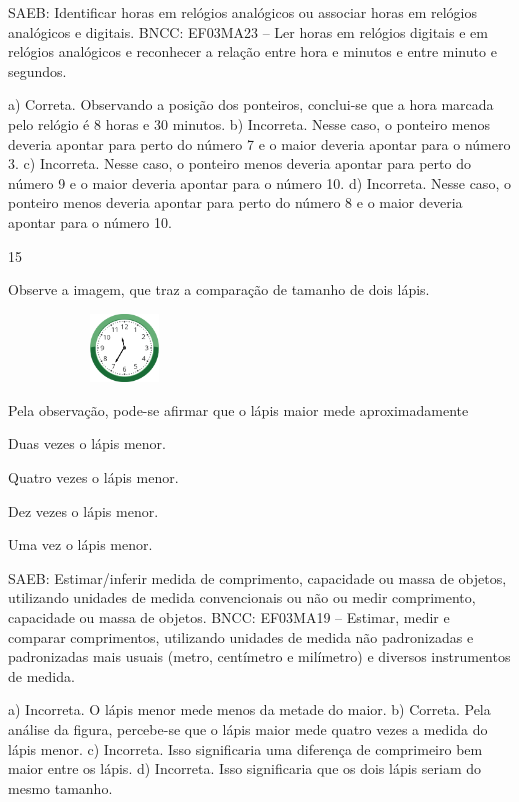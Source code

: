 \begin{multicols}{2}
\begin{enumerate}
{SAEB: Identificar horas em relógios analógicos ou associar
horas em relógios analógicos e digitais.
BNCC: EF03MA23 – Ler horas em relógios digitais e em relógios analógicos e reconhecer a relação
entre hora e minutos e entre minuto e segundos.


a) Correta. Observando a posição dos ponteiros, conclui-se que a hora marcada pelo
relógio é 8 horas e 30 minutos.
b) Incorreta. Nesse caso, o ponteiro menos deveria apontar para perto do número 7 e o maior deveria apontar para o número 3.
c) Incorreta. Nesse caso, o ponteiro menos deveria apontar para perto do número 9 e o maior deveria apontar para o número 10.
d) Incorreta. Nesse caso, o ponteiro menos deveria apontar para perto do número 8 e o maior deveria apontar para o número 10.

\num{15}

Observe a imagem, que traz a comparação de tamanho de dois lápis.


\includegraphics[width=2.43137in,height=0.71356in]{media/image116.png}

Pela observação, pode-se afirmar que o lápis maior mede aproximadamente

\begin{escolha}
\item
  Duas vezes o lápis menor.
\item
  Quatro vezes o lápis menor.
\item
  Dez vezes o lápis menor.
\item
  Uma vez o lápis menor.
\end{escolha}

SAEB: Estimar/inferir medida de comprimento, capacidade ou
massa de objetos, utilizando unidades de medida convencionais ou não ou
medir comprimento, capacidade ou massa de objetos.
BNCC: EF03MA19 -- Estimar, medir e comparar comprimentos, utilizando unidades de medida
não padronizadas e padronizadas mais usuais (metro, centímetro e milímetro) e diversos
instrumentos de medida.

a) Incorreta. O lápis menor mede menos da metade do maior.
b) Correta. Pela análise da figura, percebe-se que o lápis maior mede quatro vezes a medida do lápis menor.
c) Incorreta. Isso significaria uma diferença de comprimeiro bem maior entre os lápis.
d) Incorreta. Isso significaria que os dois lápis seriam do mesmo tamanho.

}
\end{enumerate}
\end{multicols}
